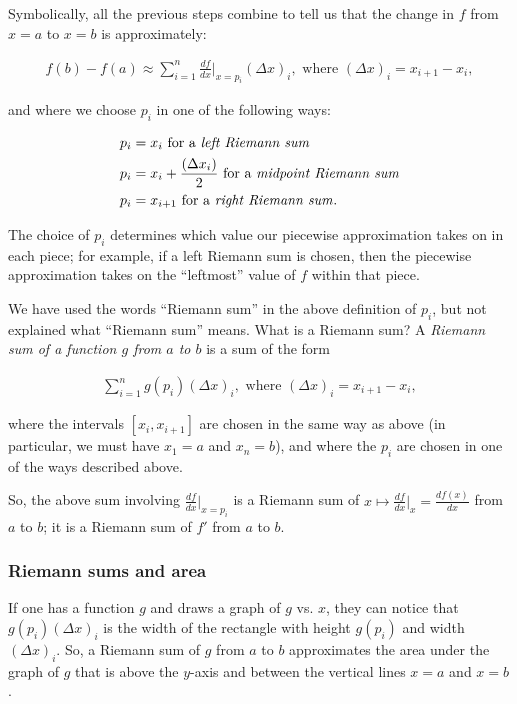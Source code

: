 Symbolically, all the previous steps combine to tell us that the change in $f$ from $x = a$ to $x = b$ is approximately:
 
\begin{align*}
    f(b) - f(a) \approx \sum_{i = 1}^n \frac{df}{dx}\Big|_{x = p_i} (\Delta x)_i, \text{ where $(\Delta x)_i = x_{i + 1} - x_i$},
\end{align*}

and where we choose $p_i$ in one of the following ways:

\begin{align*}
 p_i &= x_i \text{ for a \textit{left Riemann sum}} \\
 p_i &= x_i + \frac{(\Delta x_i)}{2} \text{ for a \textit{midpoint Riemann sum}} \\
 p_i &= x_{i + 1} \text{ for a \textit{right Riemann sum}}.
\end{align*}

The choice of $p_i$ determines which value our piecewise approximation takes on in each piece; for example, if a left Riemann sum is chosen, then the piecewise approximation takes on the ``leftmost'' value of $f$ within that piece.

We have used the words ``Riemann sum'' in the above definition of $p_i$, but not explained what ``Riemann sum'' means. What is a Riemann sum? A \textit{Riemann sum of a function $g$ from $a$ to $b$} is a sum of the form

\begin{align*}
    \sum_{i = 1}^n g(p_i) (\Delta x)_i, \text{ where $(\Delta x)_i = x_{i + 1} - x_i$},
\end{align*}

where the intervals $[x_i, x_{i + 1}]$ are chosen in the same way as above (in particular, we must have $x_1 = a$ and $x_n = b$), and where the $p_i$ are chosen in one of the ways described above.

So, the above sum involving $\frac{df}{dx}\Big|_{x = p_i}$ is a Riemann sum of $x \mapsto \frac{df}{dx}\Big|_x = \frac{df(x)}{dx}$ from $a$ to $b$; it is a Riemann sum of $f'$ from $a$ to $b$.

\subsubsection*{Riemann sums and area}

If one has a function $g$ and draws a graph of $g$ vs. $x$, they can notice that $g(p_i) (\Delta x)_i$ is the width of the rectangle with height $g(p_i)$ and width $(\Delta x)_i$. So, a Riemann sum of $g$ from $a$ to $b$ approximates the area under the graph of $g$ that is above the $y$-axis and between the vertical lines $x = a$ and $x = b$.

